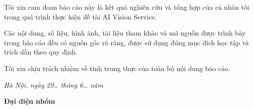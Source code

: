 
Tôi xin cam đoan báo cáo này là kết quả nghiên cứu và tổng hợp của cá nhân tôi trong quá trình thực hiện đề tài AI Vision Service.

Các nội dung, số liệu, hình ảnh, tài liệu tham khảo và mã nguồn được trình bày trong báo cáo đều có nguồn gốc rõ ràng, được sử dụng đúng mục đích học tập và trích dẫn theo quy định.

Tôi xin chịu trách nhiệm về tính trung thực của toàn bộ nội dung báo cáo.

\vspace{1cm}

\begin{flushright}
\begin{minipage}{8cm}
\centering
\textit{Hà Nội, ngày 29\ldots{} tháng 6\ldots{} năm \Nam}

\vspace{0.5cm}

\textbf{Đại diện nhóm}

\vspace{2cm}

\textbf{\NhomTruong}
\end{minipage}
\end{flushright}
